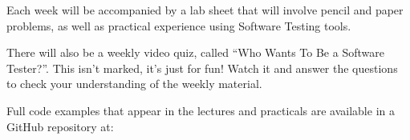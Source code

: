 Each week will be accompanied by a lab sheet that will involve pencil and paper
problems, as well as practical experience using Software Testing tools.

There will also be a weekly video quiz, called ``Who Wants To Be a Software
Tester?''. This isn't marked, it's just for fun! Watch it and answer the
questions to check your understanding of the weekly material.


Full code examples that appear in the lectures and practicals are available in a
GitHub repository at:

\begin{center}\coderepourl\end{center}

